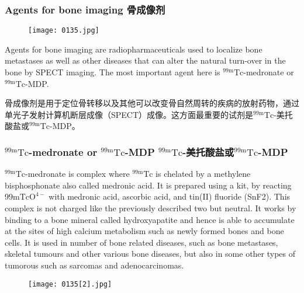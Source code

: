 \documentclass[dvipsnames, svgnames,a4paper,11pt]{article}
\begin{document}
\subsubsection{Agents for bone imaging 骨成像剂 }

\begin{figure}[h]
	\centering
    \texttt{[image: 0135.jpg]}    
     \label{fig137}
\end{figure}

 Agents for bone imaging are radiopharmaceuticals used to localize bone metastases
 as well as other diseases that can alter the natural turn-over in the bone by SPECT
 imaging. The most important agent here is ${}^\mathrm{99m}\mathrm{Tc}$-medronate or ${}^\mathrm{99m}\mathrm{Tc}$-MDP.

骨成像剂是用于定位骨转移以及其他可以改变骨自然周转的疾病的放射药物，通过单光子发射计算机断层成像（SPECT）成像。这方面最重要的试剂是${}^\mathrm{99m}\mathrm{Tc}$-美托酸盐或${}^\mathrm{99m}\mathrm{Tc}$-MDP。

\subsubsection{${}^\mathrm{99m}\mathrm{Tc}$-medronate or ${}^\mathrm{99m}\mathrm{Tc}$-MDP ${}^\mathrm{99m}\mathrm{Tc}$-美托酸盐或${}^\mathrm{99m}\mathrm{Tc}$-MDP }



$\mathrm{{}^{99m}Tc}$-medronate is complex where $\mathrm{{}^{99m}Tc}$ is chelated by a methylene
bisphosphonate also called medronic acid. It is prepared using a kit, by reacting
99m$\mathrm{TcO^{4-}}$ with medronic acid, ascorbic acid, and tin(II) fluoride (SnF2). This complex
is not charged like the previously described two but neutral. It works by binding to a
bone mineral called hydroxyapatite and hence is able to accumulate at the sites of
high calcium metabolism such as newly formed bones and bone cells. It is used in
number of bone related diseases, such as bone metastases, skeletal tumours and
other various bone diseases, but also in some other types of tumorous such as
sarcomas and adenocarcinomas.

\begin{figure}[h]
	\centering
    \texttt{[image: 0135[2].jpg]}    
     \label{fig138}
\end{figure}
\end{document}
